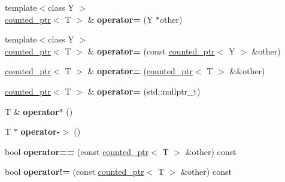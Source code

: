 \begin{DoxyCompactItemize}
\item 
\hypertarget{classcounted__ptr_a3aaa7afdb2b63f57c7f87338128d0118}{}{\footnotesize template$<$class Y $>$ }\\\hyperlink{classcounted__ptr}{counted\+\_\+ptr}$<$ T $>$ \& {\bfseries operator=} (Y $\ast$other)\label{classcounted__ptr_a3aaa7afdb2b63f57c7f87338128d0118}

\item 
\hypertarget{classcounted__ptr_adcad455fbcaf0d86804486d376baad85}{}{\footnotesize template$<$class Y $>$ }\\\hyperlink{classcounted__ptr}{counted\+\_\+ptr}$<$ T $>$ \& {\bfseries operator=} (const \hyperlink{classcounted__ptr}{counted\+\_\+ptr}$<$ Y $>$ \&other)\label{classcounted__ptr_adcad455fbcaf0d86804486d376baad85}

\item 
\hypertarget{classcounted__ptr_adbba342c0e758d3999d2fb76e0f2a46c}{}\hyperlink{classcounted__ptr}{counted\+\_\+ptr}$<$ T $>$ \& {\bfseries operator=} (\hyperlink{classcounted__ptr}{counted\+\_\+ptr}$<$ T $>$ \&\&other)\label{classcounted__ptr_adbba342c0e758d3999d2fb76e0f2a46c}

\item 
\hypertarget{classcounted__ptr_ace1f4bb25259ab1421c4c46ecd6ed447}{}\hyperlink{classcounted__ptr}{counted\+\_\+ptr}$<$ T $>$ \& {\bfseries operator=} (std\+::nullptr\+\_\+t)\label{classcounted__ptr_ace1f4bb25259ab1421c4c46ecd6ed447}

\item 
\hypertarget{classcounted__ptr_aaf76392f6b0fd5010644fe3d4cac1fd6}{}T \& {\bfseries operator$\ast$} ()\label{classcounted__ptr_aaf76392f6b0fd5010644fe3d4cac1fd6}

\item 
\hypertarget{classcounted__ptr_a11cc57380df68abd9f191076612e771d}{}T $\ast$ {\bfseries operator-\/$>$} ()\label{classcounted__ptr_a11cc57380df68abd9f191076612e771d}

\item 
\hypertarget{classcounted__ptr_a1b539cc48749971c7cba3324b0beb74c}{}bool {\bfseries operator==} (const \hyperlink{classcounted__ptr}{counted\+\_\+ptr}$<$ T $>$ \&other) const \label{classcounted__ptr_a1b539cc48749971c7cba3324b0beb74c}

\item 
\hypertarget{classcounted__ptr_aa4760363573ce12e0311e55f6c47fac9}{}bool {\bfseries operator!=} (const \hyperlink{classcounted__ptr}{counted\+\_\+ptr}$<$ T $>$ \&other) const \label{classcounted__ptr_aa4760363573ce12e0311e55f6c47fac9}


\end{DoxyCompactItemize}
